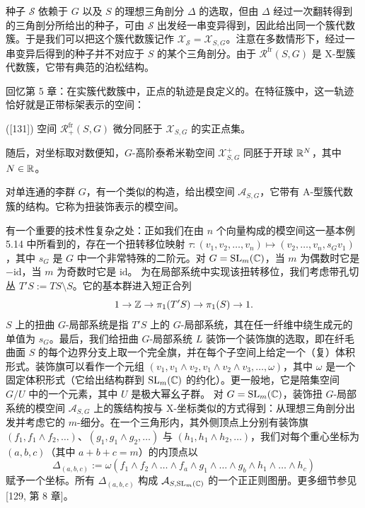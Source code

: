 种子 $\mathcal{S}$ 依赖于 $G$ 以及 $S$ 的理想三角剖分 $\Delta$ 的选取，但由 $\Delta$ 经过一次翻转得到的三角剖分所给出的种子，可由 $\mathcal{S}$ 出发经一串变异得到，因此给出同一个簇代数簇。于是我们可以把这个簇代数簇记作 $\mathcal{X}_{\mathcal{S}}=\mathcal{X}_{S,G}$。注意在多数情形下，经过一串变异后得到的种子并不对应于 $S$ 的某个三角剖分。由于 $\mathcal{R}^{\mathrm{fr}}(S,G)$ 是 X-型簇代数簇，它带有典范的泊松结构。

回忆第 5 章：在实簇代数簇中，正点的轨迹是良定义的。在特征簇中，这一轨迹恰好就是正带标架表示的空间：

\begin{theorem}[10.20] ([131]) 空间 $\mathcal{R}^{\mathrm{fr}}_+(S,G)$ 微分同胚于 $\mathcal{X}_{S,G}$ 的实正点集。
\end{theorem}

随后，对坐标取对数便知，$G$-高阶泰希米勒空间 $\mathcal{X}^+_{S,G}$ 同胚于开球 $\mathbb{R}^N$，其中 $N\in\mathbb{R}$。


\begin{remark}[10.21] 对单连通的李群 $G$，有一个类似的构造，给出模空间 $\mathcal{A}_{S,G}$，它带有 A-型簇代数簇的结构。它称为扭装饰表示的模空间。
\end{remark}

有一个重要的技术性复杂之处：正如我们在由 $n$ 个向量构成的模空间这一基本例 5.14 中所看到的，存在一个扭转移位映射 $\tau:(v_1,v_2,\dots,v_n)\mapsto(v_2,\dots,v_n,s_G v_1)$，其中 $s_G$ 是 $G$ 中一个非常特殊的二阶元。对 $G=\operatorname{SL}_m(\mathbb{C})$，当 $m$ 为偶数时它是 $-\mathrm{id}$，当 $m$ 为奇数时它是 $\mathrm{id}$。
为在局部系统中实现该扭转移位，我们考虑带孔切丛 $T'S:=TS\setminus S$。它的基本群进入短正合列
\[
1\to\mathbb{Z}\to\pi_1(T'S)\to\pi_1(S)\to1.
\]
$S$ 上的扭曲 $G$-局部系统是指 $T'S$ 上的 $G$-局部系统，其在任一纤维中绕生成元的单值为 $s_G$。最后，我们给扭曲 $G$-局部系统 $L$ 装饰一个装饰旗的选取，即在纤毛曲面 $S$ 的每个边界分支上取一个完全旗，并在每个子空间上给定一个（复）体积形式。装饰旗可以看作一个元组 $(v_1,v_1\wedge v_2,v_1\wedge v_2\wedge v_3,\dots,\omega)$，其中 $\omega$ 是一个固定体积形式（它给出结构群到 $\operatorname{SL}_m(\mathbb{C})$ 的约化）。更一般地，它是陪集空间 $G/U$ 中的一个元素，其中 $U$ 是极大幂幺子群。
对 $G=\operatorname{SL}_m(\mathbb{C})$，装饰扭 $G$-局部系统的模空间 $\mathcal{A}_{S,G}$ 上的簇结构按与 X-坐标类似的方式得到：从理想三角剖分出发并考虑它的 $m$-细分。在一个三角形内，其外侧顶点上分别有装饰旗 $(f_1,f_1\wedge f_2,\dots)$、$(g_1,g_1\wedge g_2,\dots)$ 与 $(h_1,h_1\wedge h_2,\dots)$，我们对每个重心坐标为 $(a,b,c)$（其中 $a+b+c=m$）的内顶点以
\[
\Delta_{(a,b,c)} := \omega(f_1\wedge f_2\wedge\dots\wedge f_a\wedge g_1\wedge\dots\wedge g_b\wedge h_1\wedge\dots\wedge h_c)
\]
赋予一个坐标。所有 $\Delta_{(a,b,c)}$ 构成 $\mathcal{A}_{S,\operatorname{SL}_m(\mathbb{C})}$ 的一个正正则图册。更多细节参见 [129, 第 8 章]。

